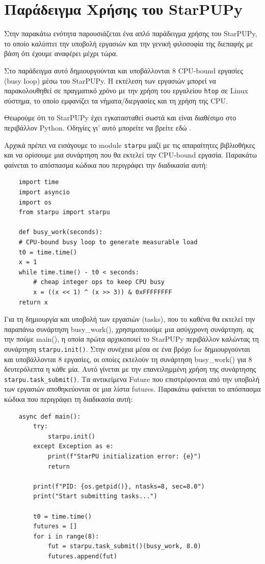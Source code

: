 \section{Παράδειγμα Χρήσης του StarPUPy}

Στην παρακάτω ενότητα παρουσιάζεται ένα απλό παράδειγμα χρήσης του StarPUPy, το οποίο καλύπτει την υποβολή εργασιών και την γενική φιλοσοφία της διεπαφής με βάση ότι έχουμε αναφέρει μέχρι τώρα.

Στο παράδειγμα αυτό δημιουργούνται και υποβάλλονται 8 CPU-bound εργασίες (busy loop) μέσω του StarPUPy. Η εκτέλεση των εργασιών μπορεί να παρακολουθηθεί σε πραγματικό χρόνο με την χρήση του εργαλείου \texttt{htop} σε Linux σύστημα, το οποίο εμφανίζει τα νήματα/διεργασίες και τη χρήση της CPU.

Θεωρούμε ότι το StarPUPy έχει εγκατασταθεί σωστά και είναι διαθέσιμο στο περιβάλλον Python. Οδηγίες γι' αυτό μπορείτε να βρείτε εδώ \cite{starpu2025handbook}. 

Αρχικά πρέπει να εισάγουμε το module \texttt{starpu} μαζί με τις απαραίτητες βιβλιοθήκες και να ορίσουμε μια συνάρτηση που θα εκτελεί την CPU-bound εργασία. Παρακάτω φαίνεται το απόσπασμα κώδικα που περιγράφει την διαδικασία αυτή:

\begin{verbatim}
    import time
    import asyncio
    import os
    from starpu import starpu

    def busy_work(seconds):
    # CPU-bound busy loop to generate measurable load
    t0 = time.time()
    x = 1
    while time.time() - t0 < seconds:
        # cheap integer ops to keep CPU busy
        x = ((x << 1) ^ (x >> 3)) & 0xFFFFFFFF
    return x
\end{verbatim}

Για τη δημιουργία και υποβολή των εργασιών (tasks), που το καθένα θα εκτελεί την παραπάνω συνάρτηση busy\_work(), χρησιμοποιούμε μια ασύγχρονη συνάρτηση, ας την πούμε main(), η οποία πρώτα αρχικοποιεί το StarPUPy περιβάλλον καλώντας τη συνάρτηση \texttt{starpu.init()}. Στην συνέχεια μέσα σε ένα βρόχο for δημιουργούνται και υποβάλλονται 8 εργασίες, οι οποίες εκτελούν τη συνάρτηση busy\_work() για 8 δευτερόλεπτα η κάθε μία. Αυτό γίνεται με την επανειλημμένη χρήση της συνάρτησης \texttt{starpu.task\_submit()}. Τα αντικείμενα Future που επιστρέφονται από την υποβολή των εργασιών αποθηκεύονται σε μια λίστα futures. Παρακάτω φαίνεται το απόσπασμα κώδικα που περιγράφει τη διαδικασία αυτή:

\begin{verbatim}
    async def main():
        try:
            starpu.init()
        except Exception as e:
            print(f"StarPU initialization error: {e}")
            return

        print(f"PID: {os.getpid()}, ntasks=8, sec=8.0")
        print("Start submitting tasks...")

        t0 = time.time()
        futures = []
        for i in range(8):
            fut = starpu.task_submit()(busy_work, 8.0)
            futures.append(fut)
\end{verbatim}

